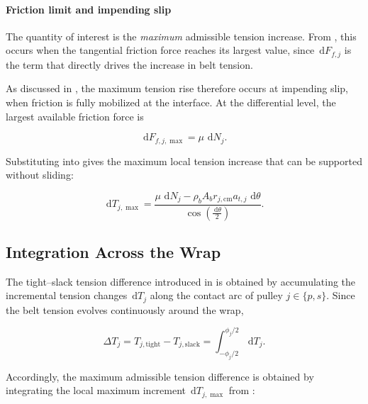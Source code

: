\documentclass[11pt]{article}
\numberwithin{equation}{section}
\newcommand{\dd}{\,\mathrm{d}}
\begin{document}
\paragraph{Friction limit and impending slip}

The quantity of interest is the \emph{maximum} admissible tension increase.
From , this occurs when the tangential friction force
reaches its largest value, since $\dd F_{f,j}$ is the term that directly drives
the increase in belt tension.

As discussed in , the maximum tension rise therefore
occurs at impending slip, when friction is fully mobilized at the interface.
At the differential level, the largest available friction force is

\begin{equation}
\dd F_{f,j,\max} = \mu \,\dd N_j.
\label{eq:friction_saturated}
\end{equation}

Substituting  into
 gives the maximum local
tension increase that can be supported without sliding:

\begin{equation}
\dd T_{j,\max}
=
\frac{
\mu\, \dd N_j
-
\rho_b A_b r_{j,\mathrm{cm}} a_{t,j}\,\dd\theta
}{
\cos\!\left(\frac{\dd \theta}{2}\right)
}.
\label{eq:dT_max_local}
\end{equation}

\subsection{Integration Across the Wrap}
\label{sec:traction_wrap}

The tight--slack tension difference introduced in
 is obtained by accumulating the
incremental tension changes \(\dd T_j\) along the contact arc of pulley
\(j \in \{p,s\}\).
Since the belt tension evolves continuously around the wrap,

\begin{equation}
\Delta T_j
=
T_{j,\mathrm{tight}} - T_{j,\mathrm{slack}}
=
\int_{-\phi_j/2}^{\phi_j/2} \dd T_j.
\label{eq:deltaT_integral_def}
\end{equation}

Accordingly, the maximum admissible tension difference is obtained
by integrating the local maximum increment \(\dd T_{j,\max}\) from
:
\end{document}
